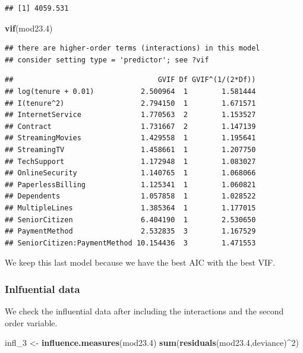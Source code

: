 \documentclass[
  twoside]{article}
\newenvironment{Shaded}{\begin{snugshade}}{\end{snugshade}}
\newcommand{\DecValTok}[1]{\textcolor[rgb]{0.00,0.00,0.81}{#1}}
\newcommand{\FloatTok}[1]{\textcolor[rgb]{0.00,0.00,0.81}{#1}}
\newcommand{\FunctionTok}[1]{\textcolor[rgb]{0.13,0.29,0.53}{\textbf{#1}}}
\newcommand{\NormalTok}[1]{#1}
\newcommand{\OtherTok}[1]{\textcolor[rgb]{0.56,0.35,0.01}{#1}}
\newcommand{\SpecialCharTok}[1]{\textcolor[rgb]{0.81,0.36,0.00}{\textbf{#1}}}
\newcommand{\StringTok}[1]{\textcolor[rgb]{0.31,0.60,0.02}{#1}}
\begin{document}
\begin{verbatim}
## [1] 4059.531
\end{verbatim}

\begin{Shaded}
\begin{Highlighting}[]
\FunctionTok{vif}\NormalTok{(mod23}\FloatTok{.4}\NormalTok{)}
\end{Highlighting}
\end{Shaded}

\begin{verbatim}
## there are higher-order terms (interactions) in this model
## consider setting type = 'predictor'; see ?vif
\end{verbatim}

\begin{verbatim}
##                                  GVIF Df GVIF^(1/(2*Df))
## log(tenure + 0.01)           2.500964  1        1.581444
## I(tenure^2)                  2.794150  1        1.671571
## InternetService              1.770563  2        1.153527
## Contract                     1.731667  2        1.147139
## StreamingMovies              1.429558  1        1.195641
## StreamingTV                  1.458661  1        1.207750
## TechSupport                  1.172948  1        1.083027
## OnlineSecurity               1.140765  1        1.068066
## PaperlessBilling             1.125341  1        1.060821
## Dependents                   1.057858  1        1.028522
## MultipleLines                1.385364  1        1.177015
## SeniorCitizen                6.404190  1        2.530650
## PaymentMethod                2.532835  3        1.167529
## SeniorCitizen:PaymentMethod 10.154436  3        1.471553
\end{verbatim}

We keep this last model because we have the best AIC with the best VIF.

\hypertarget{inlfuential-data-2}{%
\subsubsection{Inlfuential data}\label{inlfuential-data-2}}

We check the influential data after including the interactions and the
second order variable.

\begin{Shaded}
\begin{Highlighting}[]
\NormalTok{infl\_3 }\OtherTok{\textless{}{-}} \FunctionTok{influence.measures}\NormalTok{(mod23}\FloatTok{.4}\NormalTok{)}
\FunctionTok{sum}\NormalTok{(}\FunctionTok{residuals}\NormalTok{(mod23}\FloatTok{.4}\NormalTok{,}\StringTok{\textquotesingle{}deviance\textquotesingle{}}\NormalTok{)}\SpecialCharTok{\^{}}\DecValTok{2}\NormalTok{)}
\end{Highlighting}
\end{Shaded}
\end{document}
